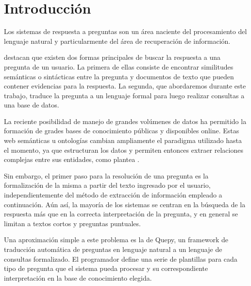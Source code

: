 \chapter{Introducción}

Los sistemas de respuesta a preguntas son un área naciente del procesamiento del lenguaje natural y particularmente del área de recuperación de información.

\citet{gupta_survey} destacan que existen dos formas principales de buscar la respuesta a una pregunta de un usuario. La primera de ellas consiste de encontrar similitudes semánticas o sintácticas entre la pregunta y documentos de texto que pueden contener evidencias para la respuesta. La segunda, que abordaremos durante este trabajo, traduce la pregunta a un lenguaje formal para luego realizar consultas a una base de datos.

La reciente posibilidad de manejo de grandes volúmenes de datos ha permitido la formación de grades bases de conocimiento públicas y disponibles online. Estas web semánticas u ontologías cambian ampliamente el paradigma utilizado hasta el momento, ya que estructuran los datos y permiten entonces extraer relaciones complejas entre sus entidades, como plantea \citet{ou_entailement}.

Sin embargo, el primer paso para la resolución de una pregunta es la formalización de la misma a partir del texto ingresado por el usuario, independientemente del método de extracción de información empleado a continuación. Aún así, la mayoría de los sistemas se centran en la búsqueda de la respuesta más que en la correcta interpretación de la pregunta, y en general se limitan a textos cortos y preguntas puntuales.

Una aproximación simple a este problema es la de Quepy, un framework de traducción automática de preguntas en lenguaje natural a un lenguaje de consultas formalizado. El programador define una serie de plantillas para cada tipo de pregunta que el sistema pueda procesar y su correspondiente interpretación en la base de conocimiento elegida.

